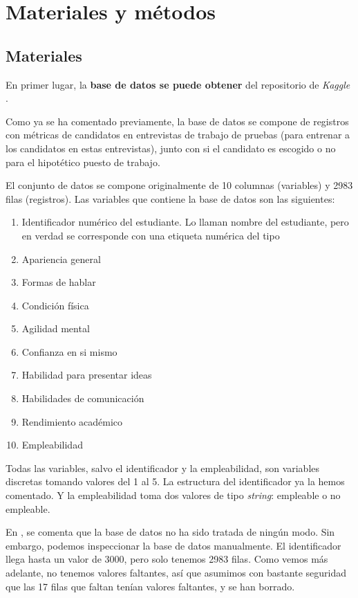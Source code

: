 \section{Materiales y métodos} \label{seccion:MaterialesMetodos}

\subsection{Materiales}

En primer lugar, la \textbf{base de datos se puede obtener} del repositorio de \textit{Kaggle} \cite{database:online}.

Como ya se ha comentado previamente, la base de datos se compone de registros con métricas de candidatos en entrevistas de trabajo de pruebas (para entrenar a los candidatos en estas entrevistas), junto con si el candidato es escogido o no para el hipotético puesto de trabajo.

El conjunto de datos se compone originalmente de 10 columnas (variables) y 2983 filas (registros). Las variables que contiene la base de datos son las siguientes:

\begin{enumerate}
    \item Identificador numérico del estudiante. Lo llaman nombre del estudiante, pero en verdad se corresponde con una etiqueta numérica del tipo 
    \item Apariencia general
    \item Formas de hablar
    \item Condición física
    \item Agilidad mental
    \item Confianza en si mismo
    \item Habilidad para presentar ideas
    \item Habilidades de comunicación
    \item Rendimiento académico
    \item Empleabilidad
\end{enumerate}

Todas las variables, salvo el identificador y la empleabilidad, son variables discretas tomando valores del 1 al 5. La estructura del identificador ya la hemos comentado. Y la empleabilidad toma dos valores de tipo \textit{string}: empleable o no empleable.

En \cite{database:online}, se comenta que la base de datos no ha sido tratada de ningún modo. Sin embargo, podemos inspeccionar la base de datos manualmente. El identificador llega hasta un valor de 3000, pero solo tenemos 2983 filas. Como vemos más adelante, no tenemos valores faltantes, así que asumimos con bastante seguridad que las 17 filas que faltan tenían valores faltantes, y se han borrado.

